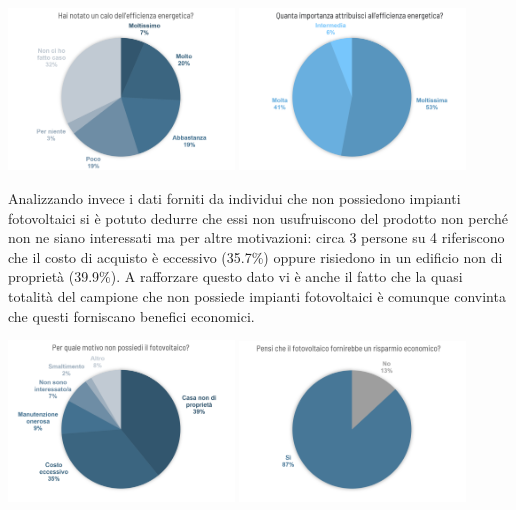 \documentclass[a4paper, 12pt]{article}
\begin{document}
	\begin{center}
		\includegraphics[width=0.45\textwidth]{Images/effetti_efficienza.png}
		\includegraphics[width=0.45\textwidth]{Images/importanza_efficienza.png}
	\end{center}
	Analizzando invece i dati forniti da individui che non possiedono impianti fotovoltaici si è potuto dedurre che essi non usufruiscono del prodotto non perché non ne siano interessati ma per altre motivazioni: circa 3 persone su 4 riferiscono che il costo di acquisto è eccessivo (35.7\%) oppure risiedono in un edificio non di proprietà (39.9\%). A rafforzare questo dato vi è anche il fatto che la quasi totalità del campione che non possiede impianti fotovoltaici è comunque convinta che questi forniscano benefici economici.
	\begin{center}
		\includegraphics[width=0.45\textwidth]{Images/no_pannelli.png}
		\includegraphics[width=0.45\textwidth]{Images/vantaggi_pannelli.png}
	\end{center}
\end{document}
